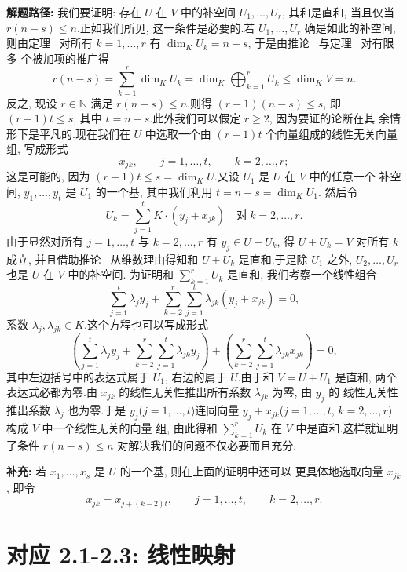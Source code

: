 \noindent\textbf{解题路径:} 我们要证明: 存在 $U$ 在 $V$ 中的补空间 $U_1, \ldots, U_r$,
其和是直和, 当且仅当 $r(n - s) \leq n$.正如我们所见, 这一条件是必要的.若
$U_1, \ldots, U_r$ 确是如此的补空间, 则由定理~ 对所有 $k = 1, \ldots, r$
有 $\dim_K U_k = n - s$, 于是由推论~ 与定理~ 对有限多
个被加项的推广得
\[
r(n - s) = \sum_{k=1}^{r} \dim_K U_k = \dim_K \bigoplus_{k=1}^{r} U_k \leq \dim_K V = n\text{.}
\]
反之, 现设 $r \in \mathbb{N}$ 满足 $r(n - s) \leq n$.则得 $(r - 1)(n - s) \leq s$, 即
$(r - 1)t \leq s$, 其中 $t = n - s$.此外我们可以假定 $r \geq 2$, 因为要证的论断在其
余情形下是平凡的.现在我们在 $U$ 中选取一个由 $(r - 1)t$ 个向量组成的线性无关向量组,
写成形式
\[
x_{jk}, \qquad j = 1, \ldots, t, \qquad k = 2, \ldots, r;
\]
这是可能的, 因为 $(r - 1)t \leq s = \dim_K U$.又设 $U_1$ 是 $U$ 在 $V$ 中的任意一个
补空间, $y_1, \ldots, y_t$ 是 $U_1$ 的一个基, 其中我们利用 $t = n - s = \dim_K U_1$.
然后令
\[
U_k = \sum_{j=1}^{t} K \cdot (y_j + x_{jk}) \quad \text{对} \ k = 2, \ldots, r\text{.}
\]
由于显然对所有 $j = 1, \ldots, t$ 与 $k = 2, \ldots, r$ 有 $y_j \in U + U_k$, 得
$U + U_k = V$ 对所有 $k$ 成立, 并且借助推论~ 从维数理由得知和
$U + U_k$ 是直和.于是除 $U_1$ 之外, $U_2, \ldots, U_r$ 也是 $U$ 在 $V$ 中的补空间.
为证明和 $\sum_{k=1}^{r} U_k$ 是直和, 我们考察一个线性组合
\[
\sum_{j=1}^{t} \lambda_j y_j + \sum_{k=2}^{r} \sum_{j=1}^{t} \lambda_{jk} (y_j + x_{jk}) = 0,
\]
系数 $\lambda_j, \lambda_{jk} \in K$.这个方程也可以写成形式
\[
\left( \sum_{j=1}^{t} \lambda_j y_j + \sum_{k=2}^{r} \sum_{j=1}^{t} \lambda_{jk} y_j \right) + \left( \sum_{k=2}^{r} \sum_{j=1}^{t} \lambda_{jk} x_{jk} \right) = 0,
\]
其中左边括号中的表达式属于 $U_1$, 右边的属于 $U$.由于和 $V = U + U_1$ 是直和, 两个
表达式必都为零.由 $x_{jk}$ 的线性无关性推出所有系数 $\lambda_{jk}$ 为零, 由 $y_j$ 的
线性无关性推出系数 $\lambda_j$ 也为零.于是 $y_j$($j = 1, \ldots, t$)连同向量
$y_j + x_{jk}$($j = 1, \ldots, t$, $k = 2, \ldots, r$)构成 $V$ 中一个线性无关的向量
组, 由此得和 $\sum_{k=1}^{r} U_k$ 在 $V$ 中是直和.这样就证明了条件 $r(n - s) \leq n$
对解决我们的问题不仅必要而且充分.

\noindent\textbf{补充:} 若 $x_1, \ldots, x_s$ 是 $U$ 的一个基, 则在上面的证明中还可以
更具体地选取向量 $x_{jk}$, 即令
\[
x_{jk} = x_{j + (k-2) t}, \qquad j = 1, \ldots, t, \qquad k = 2, \ldots, r\text{.}
\]

\section*{对应 2.1-2.3: 线性映射}

